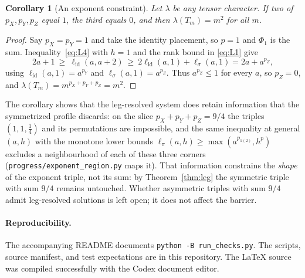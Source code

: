 \documentclass[11pt]{article}
\newtheorem{corollary}{Corollary}
\begin{document}
\begin{corollary}[An exponent constraint]\label{cor:exponent}
Let $\lambda$ be any tensor character. If two of $p_X,p_Y,p_Z$ equal
$1$, the third equals $0$, and then $\lambda(T_m)=m^2$ for all $m$.
\end{corollary}
\begin{proof}
Say $p_X=p_Y=1$ and take the identity placement, so $p=1$ and
$\Phi_1$ is the sum. Inequality~\eqref{eq:L4} with $h=1$ and the rank
bound in \eqref{eq:L1} give
\[
 2a+1\ \ge\ \ell_{\mathrm{id}}(a,a+2)\ \ge\
 2\ell_{\mathrm{id}}(a,1)+\ell_{\sigma}(a,1)=2a+a^{p_Z},
\]
using $\ell_{\mathrm{id}}(a,1)=a^{p_Y}$ and $\ell_\sigma(a,1)=a^{p_Z}$.
Thus $a^{p_Z}\le1$ for every $a$, so $p_Z=0$, and
$\lambda(T_m)=m^{p_X+p_Y+p_Z}=m^2$.
\end{proof}

The corollary shows that the leg-resolved system does retain
information that the symmetrized profile discards: on the slice
$p_X+p_Y+p_Z=9/4$ the triples $(1,1,\tfrac14)$ and its permutations are
impossible, and the same inequality at general $(a,h)$ with the
monotone lower bounds $\ell_\pi(a,h)\ge\max(a^{p_{\pi(2)}},h^{p})$
excludes a neighbourhood of each of these three corners
(\texttt{progress/exponent\_region.py} maps it). That information
constrains the \emph{shape} of the exponent triple, not its sum: by
Theorem~\ref{thm:leg} the symmetric triple with sum $9/4$ remains
untouched. Whether asymmetric triples with sum $9/4$ admit leg-resolved
solutions is left open; it does not affect the barrier.

\paragraph{Reproducibility.}
The accompanying README documents \texttt{python -B run\_checks.py}.
The scripts, source manifest, and test expectations are in this repository.
The LaTeX source was compiled successfully with the Codex document editor.
\end{document}
